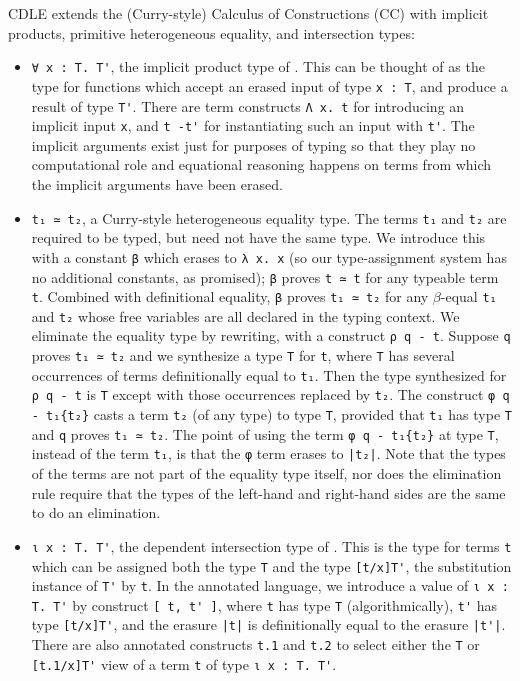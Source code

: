 \documentclass[acmsmall]{acmart}\settopmatter{}
\begin{document}
CDLE extends the (Curry-style) Calculus of Constructions (CC) with
implicit products, primitive heterogeneous equality,
and intersection types:
\begin{itemize}
\item \verb;∀ x : T. T';, the implicit product type of
  \citet{miquel01}.  This can be thought of as the type for
  functions which accept an erased input of type \verb;x : T;, and
  produce a result of type \verb;T';. There are term constructs
  \verb;Λ x. t; for introducing an implicit input \verb;x;, and
  \verb;t -t'; for instantiating such an input with \verb;t';. The
  implicit arguments exist just for purposes of typing so that they
  play no computational role and equational reasoning happens on terms
  from which the implicit arguments have been erased.

\item \verb;t₁ ≃ t₂;, a Curry-style heterogeneous equality type.  The terms
  \verb;t₁; and \verb;t₂; are required to be typed, but need not have
  the same type.  We introduce this with a constant \verb;β; which
  erases to \verb;λ x. x; (so our type-assignment system has no
  additional constants, as promised); \verb;β; proves \verb;t ≃ t; for
  any typeable term \verb;t;.  Combined with definitional equality,
  \verb;β; proves \verb;t₁ ≃ t₂; for any $\beta$-equal \verb;t₁; and
  \verb;t₂; whose free variables are all declared in the typing
  context.  We eliminate the equality type by rewriting, with a
  construct \verb;ρ q - t;.  Suppose \verb;q; proves \verb;t₁ ≃ t₂;
  and we synthesize a type \verb;T; for \verb;t;, where \verb;T; has
  several occurrences of terms definitionally equal to \verb;t₁;.
  Then the type synthesized for \verb;ρ q - t; is \verb;T; except with
  those occurrences replaced by \verb;t₂;.
  The construct \verb;φ q - t₁{t₂}; casts a term \verb;t₂; (of any type)
  to type \verb;T;, provided that \verb;t₁; has type \verb;T; and
  \verb;q; proves \verb;t₁ ≃ t₂;. The point of using the term
  \verb;φ q - t₁{t₂}; at type \verb;T;, instead of the term \verb;t₁;,
  is that the \verb;φ; term erases to \verb;|t₂|;.
  Note that the types of the
  terms are not part of the equality type itself, nor does the
  elimination rule require that the types of the left-hand and right-hand
  sides are the same to do an elimination.

\item \verb;ι x : T. T';, the dependent intersection type of
  \citet{kopylov03}.  This is the type for terms \verb;t; which
  can be assigned both the type \verb;T; and the type \verb;[t/x]T';,
  the substitution instance of \verb;T'; by \verb;t;.  In the
  annotated language, we introduce a value of \verb;ι x : T. T'; by
  construct \verb;[ t, t' ];, where \verb;t; has type \verb;T;
  (algorithmically), \verb;t'; has type \verb;[t/x]T';, and
  the erasure \verb;|t|; is definitionally equal to the erasure
  \verb;|t'|;.  There are also annotated constructs
  \verb;t.1; and \verb;t.2; to select either the \verb;T; or
  \verb;[t.1/x]T'; view of a term \verb;t; of type \verb;ι x : T. T';.
\end{itemize}
\end{document}
